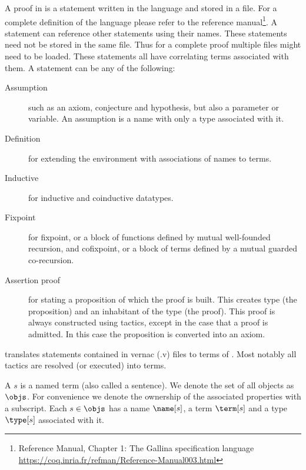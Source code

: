 \subsubsection{\gallina}
A proof in \coq is a statement written in the \gallina{} language \cite{huet1992gallina} and stored in a file.
For a complete definition of the \gallina language please refer to the \coq reference manual\footnote{\coq Reference Manual, Chapter 1: The Gallina specification language\\ \url{https://coq.inria.fr/refman/Reference-Manual003.html}}.
A statement can reference other statements using their names.
These statements need not be stored in the same file.
Thus for a complete proof multiple files might need to be loaded.
These statements all have correlating \pcic terms associated with them.
A statement can be any of the following:
\begin{description}
	\item[Assumption] such as an axiom, conjecture and hypothesis, but also a parameter or variable.
		An assumption is a name with only a type associated with it.
	\item[Definition] for extending the environment with associations of names to terms.
	\item[Inductive] for inductive and coinductive datatypes.
	\item[Fixpoint] for fixpoint, or a block of functions defined by mutual well-founded recursion, and cofixpoint, or a block of terms defined by a mutual guarded co-recursion.
	\item[Assertion proof] for stating a proposition of which the proof is built.
		This creates type (the proposition) and an inhabitant of the type (the proof).
		This proof is always constructed using tactics, except in the case that a proof is admitted.
		In this case the proposition is converted into an axiom.
\end{description}

\coq translates \gallina statements contained in \coq vernac (.v) files to terms of \pcic.
Most notably all tactics are resolved (or executed) into terms.

\begin{definition}[{\coqobj[s]}]
	A \coqobj $s$ is a named term (also called a sentence).
	We denote the set of all \coq objects as $\objs$.
	For convenience we denote the ownership of the associated properties with a subscript.
	Each \coqobj $s \in \objs$ has a name $\name[s]$,
	a term $\term[s]$ and a type $\type[s]$ associated with it.
\end{definition}


